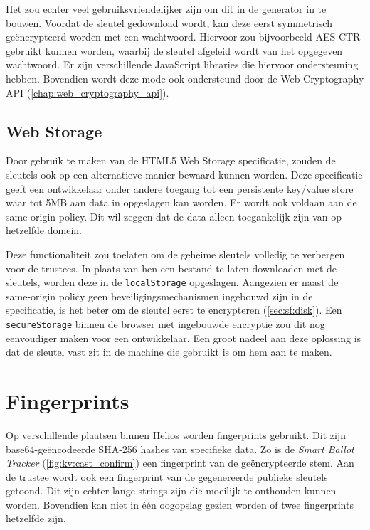 \npar Het zou echter veel gebruiksvriendelijker zijn om dit in de generator in te bouwen. Voordat de sleutel gedownload wordt, kan deze eerst symmetrisch ge\"encrypteerd worden met een wachtwoord. Hiervoor zou bijvoorbeeld AES-CTR gebruikt kunnen worden, waarbij de sleutel afgeleid wordt van het opgegeven wachtwoord.\cite{rfc2898} Er zijn verschillende JavaScript libraries die hiervoor ondersteuning hebben.\cite{site:github_aes_js}\cite{site:github_sjcl} Bovendien wordt deze mode ook ondersteund door de Web Cryptography API (\ref{chap:web_cryptography_api}).\cite{sleevi_watson_web_cryptography_api}

\subsection{Web Storage~\cite{hickson_web_storage}\cite{site:pilgrim_local_storage}}
\label{sec:sf:web_storage}

Door gebruik te maken van de HTML5 Web Storage specificatie, zouden de sleutels ook op een alternatieve manier bewaard kunnen worden. Deze specificatie geeft een ontwikkelaar onder andere toegang tot een persistente key/value store waar tot 5MB aan data in opgeslagen kan worden. Er wordt ook voldaan aan de same-origin policy. Dit wil zeggen dat de data alleen toegankelijk zijn van op hetzelfde domein.\cite{gollman_computer_security}

\npar Deze functionaliteit zou toelaten om de geheime sleutels volledig te verbergen voor de trustees. In plaats van hen een bestand te laten downloaden met de sleutels, worden deze in de \texttt{localStorage} opgeslagen. Aangezien er naast de same-origin policy geen beveiligingsmechanismen ingebouwd zijn in de specificatie, is het beter om de sleutel eerst te encrypteren (\ref{sec:sf:disk}). Een \texttt{secureStorage} binnen de browser met ingebouwde encryptie zou dit nog eenvoudiger maken voor een ontwikkelaar.\cite{site:zakas_securestore} Een groot nadeel aan deze oplossing is dat de sleutel vast zit in de machine die gebruikt is om hem aan te maken.

\section{Fingerprints}
\label{sec:sf:fingerprints}


Op verschillende plaatsen binnen Helios worden fingerprints gebruikt. Dit zijn base64-ge\"encodeerde SHA-256 hashes van specifieke data. Zo is de \textit{Smart Ballot Tracker} (\ref{fig:kv:cast_confirm}) een fingerprint van de ge\"encrypteerde stem. Aan de trustee wordt ook een fingerprint van de gegenereerde publieke sleutels getoond. Dit zijn echter lange strings zijn die moeilijk te onthouden kunnen worden. Bovendien kan niet in \'e\'en oogopslag gezien worden of twee fingerprints hetzelfde zijn.

